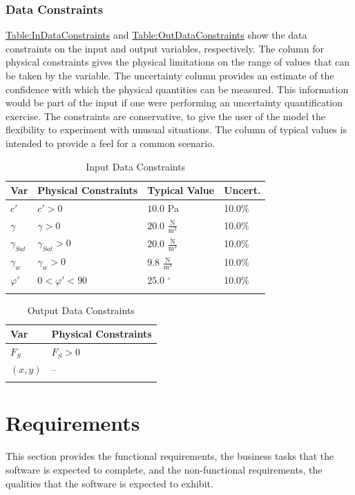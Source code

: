 \documentclass[12pt]{article}
\begin{document}
\subsubsection{Data Constraints}
\label{Sec:DataConstraints}
\hyperref[Table:InDataConstraints]{Table:InDataConstraints} and \hyperref[Table:OutDataConstraints]{Table:OutDataConstraints} show the data constraints on the input and output variables, respectively. The column for physical constraints gives the physical limitations on the range of values that can be taken by the variable. The uncertainty column provides an estimate of the confidence with which the physical quantities can be measured. This information would be part of the input if one were performing an uncertainty quantification exercise. The constraints are conservative, to give the user of the model the flexibility to experiment with unusual situations. The column of typical values is intended to provide a feel for a common scenario.
\begin{longtable}{l l l l}
\toprule
Var & Physical Constraints & Typical Value & Uncert.
\\
\midrule
$c'$ & $c'>0$ & $10.0$ Pa & 10.0$\%$
\\
$γ$ & $γ>0$ & $20.0$ $\frac{\text{N}}{\text{m}^{3}}$ & 10.0$\%$
\\
${γ_{Sat}}$ & ${γ_{Sat}}>0$ & $20.0$ $\frac{\text{N}}{\text{m}^{3}}$ & 10.0$\%$
\\
${γ_{w}}$ & ${γ_{w}}>0$ & $9.8$ $\frac{\text{N}}{\text{m}^{3}}$ & 10.0$\%$
\\
$φ'$ & $0<φ'<90$ & $25.0$ ${}^{\circ}$ & 10.0$\%$
\\
\bottomrule
\caption{Input Data Constraints}
\label{Table:InDataConstraints}
\end{longtable}
\begin{longtable}{l l}
\toprule
Var & Physical Constraints
\\
\midrule
${F_{S}}$ & ${F_{S}}>0$
\\
$(x,y)$ & --
\\
\bottomrule
\caption{Output Data Constraints}
\label{Table:OutDataConstraints}
\end{longtable}
\section{Requirements}
\label{Sec:Requirements}
This section provides the functional requirements, the business tasks that the software is expected to complete, and the non-functional requirements, the qualities that the software is expected to exhibit.
\end{document}
